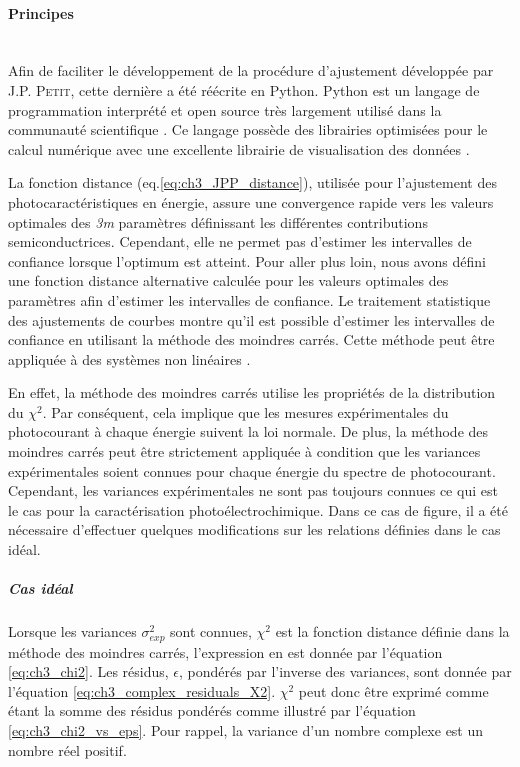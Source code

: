 \begin{refsection}
    \paragraph{Principes}\mbox{} \\
    Afin de faciliter le développement de la procédure d'ajustement développée par J.P. \textsc{Petit}, cette dernière a
    été réécrite en Python. Python est un langage de programmation interprété et open source très
    largement utilisé dans la communauté scientifique \citep{Langtangen2012, Millman2011, Kiusalaas2010, Oliphant2007}.
    Ce langage possède des librairies optimisées pour le calcul numérique \citep{VanderWalt2011, Jones} avec une
    excellente librairie de visualisation des données \citep{Hunter2007}.

    La fonction distance (eq.\ref{eq:ch3_JPP_distance}), utilisée pour l'ajustement des photocaractéristiques en
    énergie, assure une convergence rapide vers les valeurs optimales des \emph{3m} paramètres définissant les différentes
    contributions semiconductrices. Cependant, elle ne permet pas d'estimer les intervalles de confiance lorsque
    l'optimum est atteint. Pour aller plus loin, nous avons défini une fonction distance alternative calculée pour les
    valeurs optimales des paramètres afin d'estimer les intervalles de confiance. Le traitement statistique des ajustements
    de courbes montre qu'il est possible d'estimer les intervalles de confiance en utilisant la méthode
    des moindres carrés. Cette méthode peut être appliquée à des systèmes non linéaires
    \citep{Bevington2003, Nocedal2006, Press2007}. 
        
    En effet, la méthode des moindres carrés utilise les propriétés de la distribution du $\chi ^2$.
    Par conséquent, cela implique que les mesures expérimentales du photocourant à chaque énergie suivent la loi normale.
    De plus, la méthode des moindres carrés peut être strictement appliquée à condition que les variances expérimentales
    soient connues pour chaque énergie du spectre de photocourant. Cependant, les variances expérimentales ne sont pas
    toujours connues ce qui est le cas pour la caractérisation photoélectrochimique. Dans ce cas de figure, il a été
    nécessaire d'effectuer quelques modifications sur les relations définies dans le cas idéal.

    \subparagraph{Cas idéal} 
    Lorsque les variances $\sigma _{exp}^2$ sont connues, $\chi ^2$ est la fonction distance définie
    dans la méthode des moindres carrés, l'expression en est donnée par l'équation \ref{eq:ch3_chi2}. Les résidus,
    $\epsilon$, pondérés par l'inverse des variances, sont donnée par l'équation \ref{eq:ch3_complex_residuals_X2}.
    $\chi ^2$ peut donc être exprimé comme étant la somme des résidus pondérés comme illustré par l'équation
    \ref{eq:ch3_chi2_vs_eps}. Pour rappel, la variance d'un nombre complexe est un nombre réel positif.
    

\end{refsection}
